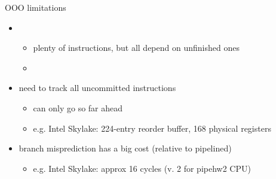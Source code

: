\begin{frame}{OOO limitations}
    \begin{itemize}
        \item {}
            \begin{itemize}
            \item plenty of instructions, but all depend on unfinished ones
            \item {}
            \end{itemize}
        \item need to track all uncommitted instructions
            \begin{itemize}
            \item can only go so far ahead
            \item e.g. Intel Skylake: 224-entry reorder buffer, 168 physical registers
            \end{itemize}
        \item branch misprediction has a big cost (relative to pipelined)
            \begin{itemize}
            \item e.g. Intel Skylake: approx 16 cycles (v. 2 for pipehw2 CPU)
            \end{itemize}
    \end{itemize}
\end{frame}
